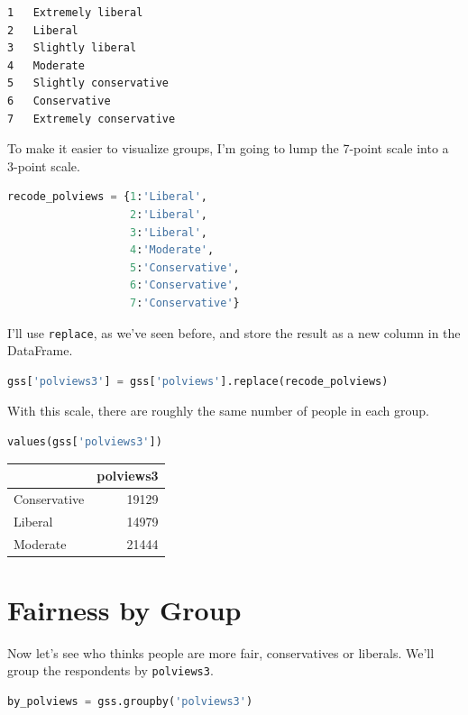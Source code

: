 \begin{lstlisting}[]
1   Extremely liberal
2   Liberal
3   Slightly liberal
4   Moderate
5   Slightly conservative
6   Conservative
7   Extremely conservative
\end{lstlisting}

To make it easier to visualize groups, I'm going to lump the 7-point
scale into a 3-point scale.

\begin{lstlisting}[language=Python]
recode_polviews = {1:'Liberal', 
                   2:'Liberal', 
                   3:'Liberal', 
                   4:'Moderate', 
                   5:'Conservative', 
                   6:'Conservative', 
                   7:'Conservative'}
\end{lstlisting}

I'll use \passthrough{\lstinline!replace!}, as we've seen before, and
store the result as a new column in the DataFrame.

\begin{lstlisting}[language=Python]
gss['polviews3'] = gss['polviews'].replace(recode_polviews)
\end{lstlisting}

With this scale, there are roughly the same number of people in each
group.

\begin{lstlisting}[language=Python]
values(gss['polviews3'])
\end{lstlisting}

\begin{tabular}{lr}
\toprule
{} &  polviews3 \\
\midrule
Conservative &      19129 \\
Liberal      &      14979 \\
Moderate     &      21444 \\
\bottomrule
\end{tabular}

\hypertarget{fairness-by-group}{%
\section{Fairness by Group}\label{fairness-by-group}}

Now let's see who thinks people are more fair, conservatives or
liberals. We'll group the respondents by
\passthrough{\lstinline!polviews3!}.

\begin{lstlisting}[language=Python]
by_polviews = gss.groupby('polviews3')
\end{lstlisting}

